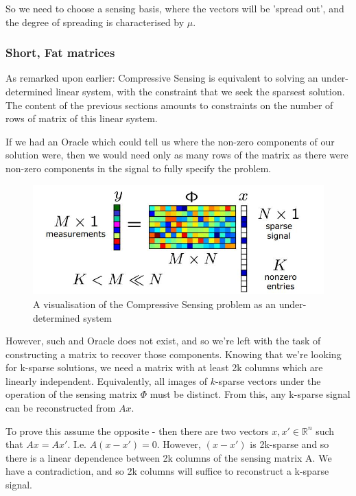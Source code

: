\documentclass[12pt, a4paper]{article}
\begin{document}
So we need to choose a sensing basis, where the vectors will be 'spread out', and the degree of spreading is characterised by \(\mu\).

\subsubsection{Short, Fat matrices}
As remarked upon earlier: Compressive Sensing is equivalent to solving an under-determined linear system, with the constraint that we seek the sparsest solution. The content of the previous sections amounts to constraints on the number of rows of matrix of this linear system. 

If we had an Oracle which could tell us where the non-zero components of our solution were, then we would need only as many rows of the matrix as there were non-zero components in the signal to fully specify the problem. 

\begin{figure}[h]
\centering
\includegraphics[height = 7 cm, width=\textwidth]{compressive_sensing_example.jpg}
\caption{A visualisation of the Compressive Sensing problem as an under-determined system}
\label{l1l2}
\end{figure}

However, such and Oracle does not exist, and so we're left with the task of constructing a matrix to recover those components. Knowing that we're looking for k-sparse solutions, we need a matrix with at least 2k columns which are linearly independent. Equivalently, all images of \(k\)-sparse vectors under the operation of the sensing matrix \(\Phi\) must be distinct. From this, any k-sparse signal can be reconstructed from \(Ax\). 

To prove this assume the opposite - then there are two vectors \(x, x' \in \mathbb{R}^n\) such that \(Ax = Ax'\). I.e. \(A(x-x') = 0\). However, \((x-x')\) is 2k-sparse and so there is a linear dependence between 2k columns of the sensing matrix A. We have a contradiction, and so 2k columns will suffice to reconstruct a k-sparse signal. 
\end{document}
